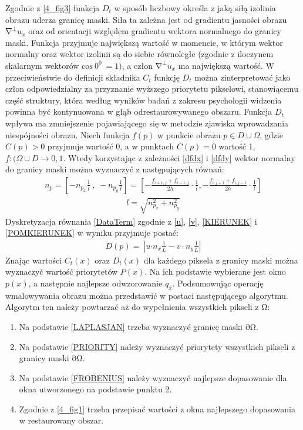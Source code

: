 \documentclass[12pt, twoside, openany]{report}
\theoremstyle{definition}
\begin{document}
Zgodnie z \autoref{4_fig3} funkcja $D_t$ w sposób liczbowy określa z jaką siłą izolinia obrazu uderza granicę maski. Siła ta zależna jest od gradientu jasności obrazu ${\mathrm{\nabla }}^{\bot }u_x$ oraz od orientacji względem gradientu wektora normalnego do granicy maski. Funkcja przyjmuje największą wartość w momencie, w którym wektor normalny oraz wektor izolinii są do siebie równoległe (zgodnie z iloczynem skalarnym wektorów ${\mathrm{cos} \ 0^0\ }=1)$, a człon ${\mathrm{\nabla }}^{\bot }u_x$ ma największą wartość. W przeciwieństwie do definicji składnika $C_t$ funkcję $D_t$ można zinterpretować jako człon odpowiedzialny za przyznanie wyższego priorytetu pikselowi, stanowiącemu część struktury, która według wyników badań z zakresu psychologii widzenia powinna być kontynuowana w głąb odrestaurowywanego obszaru. Funkcja $D_t$ wpływa ma zmniejszenie pojawiającego się w metodzie zjawiska wprowadzania niespójności obrazu. Niech funkcja $f(p)$ w punkcie obrazu $p \in D \cup \Omega$, gdzie $C(p) > 0$ przyjmuje wartość 0, a w punktach $C(p) = 0$ wartość 1, $f : (\Omega \cup D \to {0,1}$.  Wtedy korzystając z zależności \eqref{dfdx} i \eqref{dfdy} wektor normalny do granicy maski można wyznaczyć z następujących równań:
\begin{align}
n_p= \left[-n_{p_x}\frac{1}{l}\ ,\ -n_{p_y} \frac{1}{l}\right] =\left[-\frac{f_{i+1,j}+f_{i-1,j}}{2h}\cdot \frac{1}{l}, -\frac{f_{i,j+1} + f_{i,j-1}}{2h} \cdot \frac{1}{l}\right]
\label{KIERUNEK}
\end{align}
\begin{align}
l= \sqrt{n^2_{p_x} + n^2_{p_y}}
\label{POMKIERUNEK}
\end{align}
Dyskretyzacja równania \eqref{DataTerm} zgodnie z \eqref{u}, \eqref{v}, \eqref{KIERUNEK} i \eqref{POMKIERUNEK} w wyniku przyjmuje postać:
\begin{align}
D(p)=\ \left|u{\cdot n}_x\frac{1}{L}-v\cdot n_y\frac{1}{L}\right|
\end{align}
Znając wartości $C_t\left(x\right)$ oraz $D_t(x)$ dla każdego piksela z granicy maski można wyznaczyć wartość priorytetów $P(x)$. Na ich podstawie wybierane jest okno $p(x)$, a następnie najlepsze odwzorowanie $q_{\hat{x}}$.
Podsumowując operację wmalowywania obrazu można przedstawić w postaci następującego algorytmu. Algorytm ten należy powtarzać aż do wypełnienia wszystkich pikseli z $\mathrm{\Omega }$:
\begin{enumerate}
\item
Na podstawie \eqref{LAPLASJAN} trzeba wyznaczyć granicę maski $\mathrm{\partial }\mathrm{\Omega }$.
\item
Na podstawie \eqref{PRIORITY} należy wyznaczyć priorytety wszystkich pikseli z granicy maski $\mathrm{\partial }\mathrm{\Omega }$.
\item
Na podstawie \eqref{FROBENIUS} należy wyznaczyć najlepsze dopasowanie dla okna utworzonego na podstawie punktu 2.
\item
Zgodnie z \autoref{4_fig1} trzeba przepisać wartości z okna najlepszego dopasowania w restaurowany obszar.
\end{enumerate}
\end{document}
